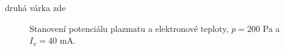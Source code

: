 \documentclass[a4paper,12pt]{article}
\begin{document}
druhá várka zde

\begin{figure}[h]
	\centering
	\begin{subfigure}[b]{.49\textwidth}
		\centering
	\end{subfigure}
	\begin{subfigure}[b]{.49\textwidth}
		\centering
	\end{subfigure}
	\caption{Stanovení potenciálu plazmatu a elektronové teploty, $p = 200$ \si{\pascal} a $I_\text{v} = 40$ \si{\milli\ampere}.}
	\label{data3}
\end{figure}
\end{document}
